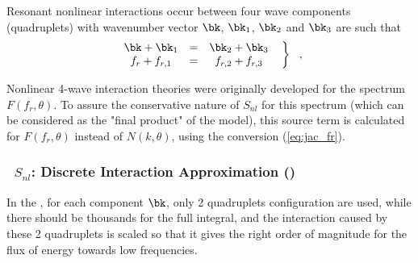 \noindent

Resonant nonlinear interactions occur between four wave components
(quadruplets) with wavenumber vector $\bk$, $\bk_1$, $\bk_2$ and $\bk_3$ are such that 
\begin{equation} \left .
\begin{array}{ccc}
  \bk + \bk_1 & = & \bk_2 + \bk_3     \\
  f_r + f_{r,1}& =& f_{r,2} +  f_{r,3} 
\end{array} \:\:\: \right \rbrace \:\:\: , \label{eq:resonance}
\end{equation}

Nonlinear 4-wave interaction theories were
originally developed for the spectrum $F(f_r ,\theta)$. To assure the
conservative nature of $S_{nl}$ for this spectrum (which can be considered as
the "final product" of the model), this source term is calculated for
$F(f_r,\theta)$ instead of $N(k,\theta)$, using the conversion
(\ref{eq:jac_fr}).

\vsssub
\subsubsection{~$S_{nl}$: Discrete Interaction Approximation (\dia)} \label{sec:NL1}
\vsssub




 In the \dia, for each component $\bk$, only 2 quadruplets configuration are 
used, while there should be thousands for the full integral, and the interaction caused by these 2 quadruplets 
is scaled so that it gives the right order of magnitude for the flux of energy towards low frequencies. 

